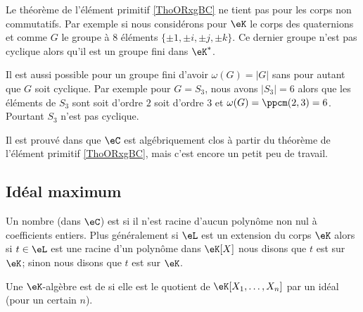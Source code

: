 \begin{example}
    Le théorème de l'élément primitif \ref{ThoORxgBC} ne tient pas pour les corps non commutatifs. Par exemple si nous considérons pour \( \eK\) le corps des quaternions et comme \( G\) le groupe à \( 8\) éléments \( \{ \pm 1,\pm i,\pm j,\pm k \}\). Ce dernier groupe n'est pas cyclique alors qu'il est un groupe fini dans \( \eK^*\).
\end{example}

\begin{example}
    Il est aussi possible pour un groupe fini d'avoir \( \omega(G)=| G |\) sans pour autant que \( G\) soit cyclique. Par exemple pour \( G=S_3\), nous avons \( | S_3 |=6\) alors que les éléments de \( S_3\) sont soit d'ordre \( 2\) soit d'ordre \( 3\) et \( \omega(G)=\ppcm(2,3)=6\). Pourtant \( S_3\) n'est pas cyclique.
\end{example}


\begin{remark}
    Il est prouvé dans \cite{rqrNyg} que \( \eC\) est algébriquement clos à partir du théorème de l'élément primitif \ref{ThoORxgBC}, mais c'est encore un petit peu de travail.
\end{remark}

\subsection{Idéal maximum}

\begin{definition}
    Un nombre (dans \( \eC\)) est  si il n'est racine d'aucun polynôme non nul à coefficients entiers. Plus généralement si \( \eL\) est un extension du corps \( \eK\) alors si \( t\in \eL\) est une racine d'un polynôme dans \( \eK[X]\) nous disons que \( t\) est  sur \( \eK\); sinon nous disons que \( t\) est  sur \( \eK\).
\end{definition}

\begin{definition}
    Une \( \eK\)-algèbre est de  si elle est le quotient de \( \eK[X_1,\ldots, X_n]\) par un idéal (pour un certain \( n\)).
\end{definition}

